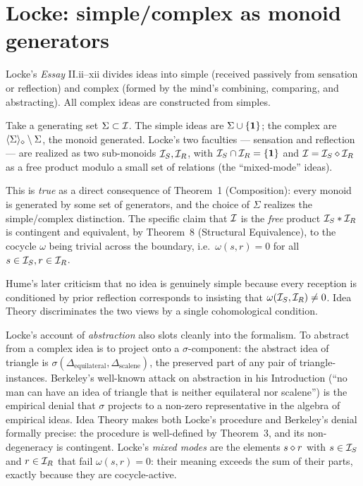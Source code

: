 \section{Locke: simple/complex as monoid generators}\label{sec:locke}

 Locke's \emph{Essay} II.ii--xii
\cite{Locke1690} divides ideas into simple (received passively from
sensation or reflection) and complex (formed by the mind's combining,
comparing, and abstracting). All complex ideas are constructed from
simples.

\formalclaim Take a generating set $\Sigma\subset\mathcal{I}$. The simple
ideas are $\Sigma\cup\{\mathbf{1}\}$; the complex are
$\langle\Sigma\rangle_{\mathbin{\diamond}}\setminus\Sigma$, the monoid generated.
Locke's two faculties --- sensation and reflection --- are realized as
two sub-monoids $\mathcal{I}_S, \mathcal{I}_R$, with
$\mathcal{I}_S\cap\mathcal{I}_R = \{\mathbf{1}\}$ and $\mathcal{I} =
\mathcal{I}_S\mathbin{\diamond}\mathcal{I}_R$ as a free product modulo a small set of
relations (the ``mixed-mode'' ideas).

\formalstatus This is \emph{true} as a direct consequence of Theorem~1
(Composition): every monoid is generated by some set of generators, and
the choice of $\Sigma$ realizes the simple/complex distinction. The
specific claim that $\mathcal{I}$ is the \emph{free} product
$\mathcal{I}_S * \mathcal{I}_R$ is contingent and equivalent, by Theorem~8
(Structural Equivalence), to the cocycle $\omega$ being trivial across
the boundary, i.e.\ $\omega(s, r) = 0$ for all $s\in\mathcal{I}_S, r\in
\mathcal{I}_R$.

\litcomment Hume's later criticism that no idea is genuinely simple
because every reception is conditioned by prior reflection corresponds
to insisting that $\omega(\mathcal{I}_S,\mathcal{I}_R)\neq 0$. Idea Theory
discriminates the two views by a single cohomological condition.

Locke's account of \emph{abstraction} also slots cleanly into the
formalism. To abstract from a complex idea is to project onto a
$\sigma$-component: the abstract idea of triangle is
$\sigma(\Delta_{\mathrm{equilateral}}, \Delta_{\mathrm{scalene}})$, the
preserved part of any pair of triangle-instances. Berkeley's well-known
attack on abstraction in his Introduction \cite{Berkeley1710}
(``no man can have an idea of triangle that is neither equilateral nor
scalene'') is the empirical denial that $\sigma$ projects to a non-zero
representative in the algebra of empirical ideas. Idea Theory makes
both Locke's procedure and Berkeley's denial formally precise: the
procedure is well-defined by Theorem~3, and its non-degeneracy is
contingent. Locke's \emph{mixed modes} are the elements
$s\mathbin{\diamond} r$ with $s\in\mathcal{I}_S$ and $r\in\mathcal{I}_R$ that fail
$\omega(s,r)=0$: their meaning exceeds the sum of their parts, exactly
because they are cocycle-active.

